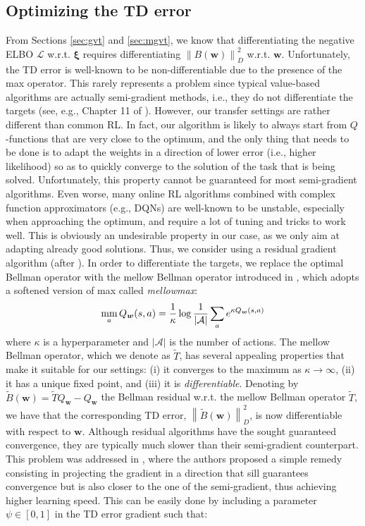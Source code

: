\documentclass{article}
\newcommand{\mm}{\operatornamewithlimits{mm}}
\newcommand{\wt}[1]{\widetilde{#1}}
\newcommand{\norm}[1]{\left\lVert #1 \right\rVert}
\begin{document}
\subsection{Optimizing the TD error}

From Sections \ref{sec:gvt} and \ref{sec:mgvt}, we know that differentiating the negative ELBO $\mathcal{L}$ w.r.t. $\bm{\xi}$ requires differentiating $\norm{B(\bm{w})}_D^2$ w.r.t. $\bm{w}$. Unfortunately, the TD error is well-known to be non-differentiable due to the presence of the max operator. This rarely represents a problem since typical value-based algorithms are actually semi-gradient methods, i.e., they do not differentiate the targets (see, e.g., Chapter 11 of \cite{}). However, our transfer settings are rather different than common RL. In fact, our algorithm is likely to always start from $Q$-functions that are very close to the optimum, and the only thing that needs to be done is to adapt the weights in a direction of lower error (i.e., higher likelihood) so as to quickly converge to the solution of the task that is being solved. Unfortunately, this property cannot be guaranteed for most semi-gradient algorithms. Even worse, many online RL algorithms combined with complex function approximators (e.g., DQNs) are well-known to be unstable, especially when approaching the optimum, and require a lot of tuning and tricks to work well. This is obviously an undesirable property in our case, as we only aim at adapting already good solutions. Thus, we consider using a residual gradient algorithm (after \cite{}). In order to differentiate the targets, we replace the optimal Bellman operator with the mellow Bellman operator introduced in \cite{}, which adopts a softened version of max called \textit{mellowmax}:
\begin{equation}
\mm_a Q_{\bm{w}}(s,a) = \frac{1}{\kappa} \log \frac{1}{|\mathcal{A}|}\sum_a e^{\kappa Q_{\bm{w}}(s,a)}
\end{equation}
where $\kappa$ is a hyperparameter and $|\mathcal{A}|$ is the number of actions. The mellow Bellman operator, which we denote as $\wt{T}$, has several appealing properties that make it suitable for our settings: (i) it converges to the maximum as $\kappa \rightarrow \infty$, (ii) it has a unique fixed point, and (iii) it is \textit{differentiable}. Denoting by $\wt{B}(\bm{w}) = \wt{T}Q_{\bm{w}} - Q_{\bm{w}}$ the Bellman residual w.r.t. the mellow Bellman operator $\wt{T}$, we have that the corresponding TD error, $\norm{\wt{B}(\bm{w})}_D^2$, is now differentiable with respect to $\bm{w}$. Although residual algorithms have the sought guaranteed convergence, they are typically much slower than their semi-gradient counterpart. This problem was addressed in \cite{}, where the authors proposed a simple remedy consisting in projecting the gradient in a direction that sill guarantees convergence but is also closer to the one of the semi-gradient, thus achieving higher learning speed. This can be easily done by including a parameter $\psi\in[0,1]$ in the TD error gradient such that:
\end{document}
